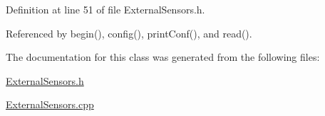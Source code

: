 Definition at line 51 of file External\+Sensors.\+h.



Referenced by begin(), config(), print\+Conf(), and read().



The documentation for this class was generated from the following files\+:\begin{DoxyCompactItemize}
\item 
\hyperlink{ExternalSensors_8h}{External\+Sensors.\+h}\item 
\hyperlink{ExternalSensors_8cpp}{External\+Sensors.\+cpp}\end{DoxyCompactItemize}
